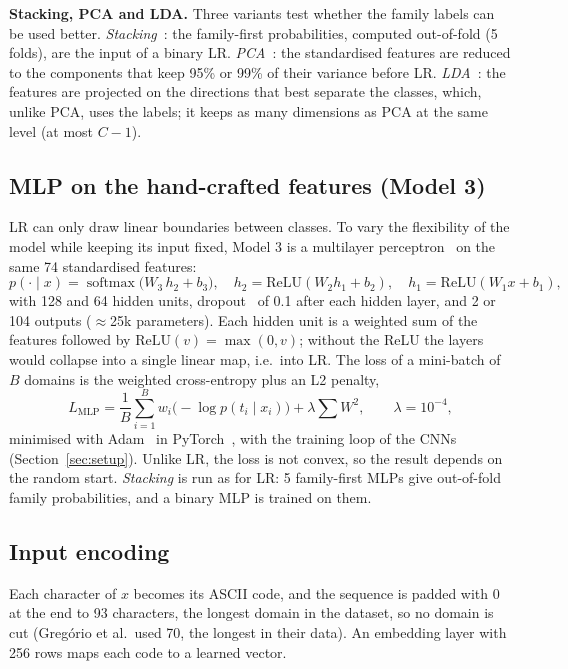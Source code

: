 \documentclass[11pt]{article}
\begin{document}
\textbf{Stacking, PCA and LDA.} Three variants test whether the family labels can be
used better. \emph{Stacking}~\cite{wolpert1992stacked}: the family-first probabilities,
computed out-of-fold (5 folds), are the input of a binary LR. \emph{PCA}~\cite{jolliffe2002pca}:
the standardised features are reduced to the components that keep 95\% or
99\% of their variance before LR. \emph{LDA}~\cite{fisher1936lda}: the features are
projected on the directions that best separate the classes, which, unlike PCA,
uses the labels; it keeps as many dimensions as PCA at the same level (at most
$C-1$).

\subsection{MLP on the hand-crafted features (Model 3)}\label{sec:mlp}
LR can only draw linear boundaries between classes. To vary the flexibility of the
model while keeping its input fixed, Model 3 is a multilayer
perceptron~\cite{rumelhart1986backprop} on the same 74 standardised features:
\begin{equation}
p(\cdot \mid x) = \operatorname{softmax}\big(W_3\,h_2 + b_3\big),\quad
h_2 = \mathrm{ReLU}(W_2 h_1 + b_2),\quad h_1 = \mathrm{ReLU}(W_1 x + b_1),
\end{equation}
with 128 and 64 hidden units, dropout~\cite{srivastava2014dropout} of 0.1 after each
hidden layer, and 2 or 104 outputs ($\approx$25k parameters). Each hidden unit is a
weighted sum of the features followed by $\mathrm{ReLU}(v) = \max(0, v)$; without the
ReLU the layers would collapse into a single linear map, i.e.\ into LR. The loss of a
mini-batch of $B$ domains is the weighted cross-entropy plus an L2 penalty,
\begin{equation}
L_{\text{MLP}} = \frac{1}{B}\sum_{i=1}^{B} w_i \big(-\log p(t_i \mid x_i)\big)
+ \lambda \sum W^2, \qquad \lambda = 10^{-4},
\label{eq:mlploss}
\end{equation}
minimised with Adam~\cite{kingma2015adam} in PyTorch~\cite{paszke2019pytorch}, with
the training loop of the CNNs (Section~\ref{sec:setup}). Unlike LR, the loss is not
convex, so the result depends on the random start. \emph{Stacking} is run as for LR:
5 family-first MLPs give out-of-fold family probabilities, and a binary MLP is
trained on them.

\subsection{Input encoding}
Each character of $x$ becomes its ASCII code, and the sequence is padded with 0 at
the end to 93 characters, the longest domain in the dataset, so no domain is cut
(Greg{\'o}rio et al.\ used 70, the longest in their data). An embedding layer with
256 rows maps each code to a learned vector.
\end{document}
